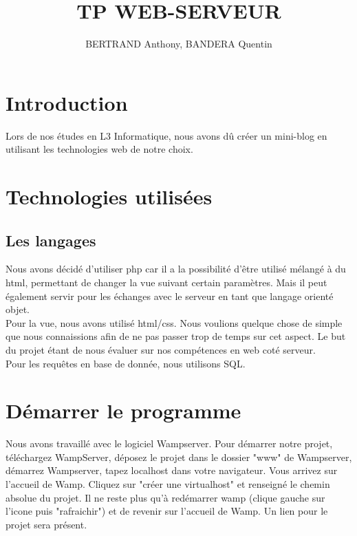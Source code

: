\documentclass{article}
\title{TP WEB-SERVEUR}
\date{}
\author{BERTRAND Anthony, BANDERA Quentin}
\begin{document}
    \maketitle
    \tableofcontents
    \newpage
    \section{Introduction}
    Lors de nos études en L3 Informatique, nous avons dû créer un mini-blog en utilisant les technologies web de notre choix.


    \section{Technologies utilisées}
    \subsection{Les langages}
    Nous avons décidé d'utiliser php car il a la possibilité d'être utilisé mélangé à du html, permettant de changer la vue suivant certain
    paramètres. Mais il peut également servir pour les échanges avec le serveur en tant que langage orienté objet.\\
    Pour la vue, nous avons utilisé html/css. Nous voulions quelque chose de simple que nous connaissions afin de ne pas passer trop de temps
    sur cet aspect. Le but du projet étant de nous évaluer sur nos compétences en web coté serveur.\\
    Pour les requêtes en base de donnée, nous utilisons SQL.


    \section{Démarrer le programme}
    Nous avons travaillé avec le logiciel Wampserver. Pour démarrer notre projet, téléchargez WampServer, déposez le projet
    dans le dossier "www" de Wampserver, démarrez Wampserver, tapez localhost dans votre navigateur. Vous arrivez sur l'accueil
    de Wamp. Cliquez sur "créer une virtualhost" et renseigné le chemin absolue du projet. Il ne reste plus qu'à redémarrer 
    wamp (clique gauche sur l'icone puis "rafraichir") et de revenir sur l'accueil de Wamp. Un lien pour le projet sera présent.
\end{document}

